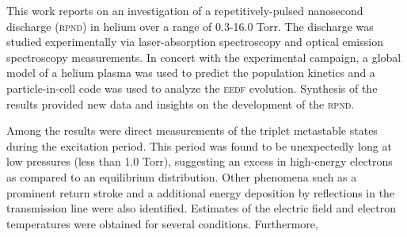 This work reports on an investigation of a repetitively-pulsed nanosecond
discharge (\textsc{rpnd}) in helium over a range of 0.3-16.0 Torr. The discharge
was studied experimentally via laser-absorption spectroscopy and optical
emission spectroscopy measurements. In concert with the experimental campaign, a
global model of a helium plasma was used to predict the population kinetics and
a particle-in-cell code was used to analyze the \textsc{eedf} evolution.
Synthesis of the results provided new data and insights on the development of
the \textsc{rpnd}.

Among the results were direct measurements of the triplet metastable states
during the excitation period. This period was found to be unexpectedly long at
low pressures (less than 1.0 Torr), suggesting an excess in high-energy
electrons as compared to an equilibrium distribution. Other phenomena such as a
prominent return stroke and a additional energy deposition by reflections in the
transmission line were also identified. Estimates of the electric field and
electron temperatures were obtained for several conditions. Furthermore,
